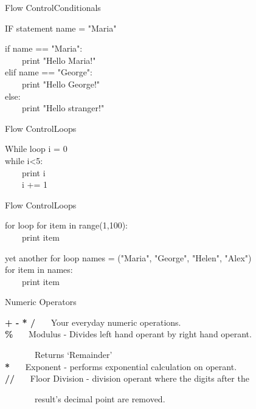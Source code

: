 \documentclass{beamer}
\begin{document}
  \begin{frame}{Flow Control}{Conditionals}

    \begin{block}{IF statement}
    name = "Maria"

    if name == "Maria":\\
    \ \ \ \ print "Hello Maria!"\\
    elif name == "George":\\
    \ \ \ \ print "Hello George!"\\
    else:\\
    \ \ \ \ print "Hello stranger!"\\
    \end{block}
    
  \end{frame}

  \begin{frame}{Flow Control}{Loops}
    
    \begin{block}{While loop}
      i = 0\\
      while i\textless5:\\
      \ \ \ \ print i\\
      \ \ \ \ i += 1\\
    \end{block}

  \end{frame}

  \begin{frame}{Flow Control}{Loops}

    \begin{block}{for loop}
      for item in range(1,100):\\
      \ \ \ \ print item\\
    \end{block}
    \begin{block}{yet another for loop}
        names = ("Maria", "George", "Helen", "Alex")\\
        
        for item in names:\\
        \ \ \ \ print item\\
    \end{block}
    
  \end{frame}

  \begin{frame}{Numeric Operators}
    
    {\bf + - * /} \ \ \ Your everyday numeric operations.\\
    {\bf \%} \ \ \ Modulus - Divides left hand operant by right hand operant. 
      
    \ \ \ \ \ \ \ Returns `Remainder'\\
    {\bf **} \ \ \ Exponent - performs exponential calculation on operant.\\
    {\bf //} \ \ \ Floor Division - division operant where the digits after the 
    
    \ \ \ \ \ \ \ result's decimal point are removed.

  \end{frame}
\end{document}
